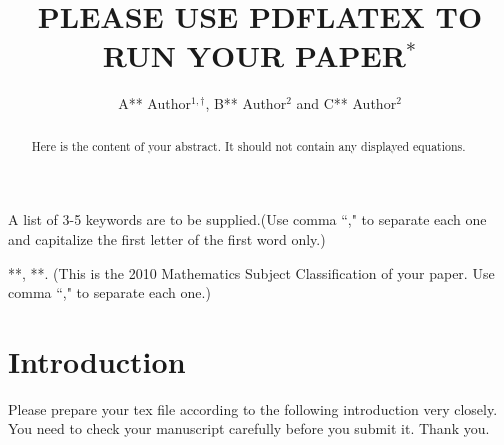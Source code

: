\documentclass{jaac}
\title{\uppercase{Please use pdflatex to run your paper$^*$}}
\author{ A** Author$^{1,\dag}$, B** Author$^2$ and C** Author$^2$}%
\date{}
\begin{document}
\baselineskip 12pt

\maketitle
\begin{abstract}
Here is the  content of your abstract. It should not contain any displayed equations.
\end{abstract}

\begin{keyword}
A list of 3-5 keywords are to be supplied.(Use comma ``," to separate each one and capitalize the first letter of the first word only.)
\end{keyword}

\begin{MSC}
**, **.
(This is the 2010 Mathematics Subject Classification of your paper. Use comma ``," to separate each one.)
\end{MSC}


\thispagestyle{first}

\vspace{-2mm}


\section{Introduction}
Please prepare your tex file according to the following introduction
very closely. You need to check your manuscript carefully before you submit it. Thank you.
\end{document}
